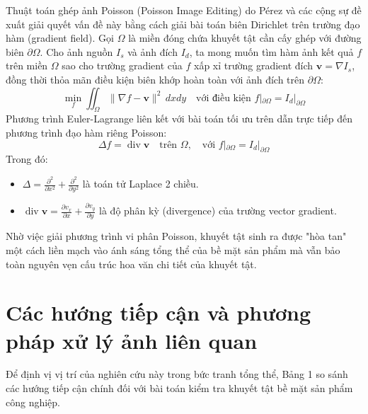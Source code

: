 Thuật toán ghép ảnh Poisson (Poisson Image Editing) do Pérez và các cộng sự đề xuất \cite{perez2003} giải quyết vấn đề này bằng cách giải bài toán biên Dirichlet trên trường đạo hàm (gradient field). Gọi $\Omega$ là miền đóng chứa khuyết tật cần cấy ghép với đường biên $\partial \Omega$. Cho ảnh nguồn $I_s$ và ảnh đích $I_d$, ta mong muốn tìm hàm ảnh kết quả $f$ trên miền $\Omega$ sao cho trường gradient của $f$ xấp xỉ trường gradient đích $\mathbf{v} = \nabla I_s$, đồng thời thỏa mãn điều kiện biên khớp hoàn toàn với ảnh đích trên $\partial \Omega$:
\begin{equation}
    \min_{f} \iint_{\Omega} \|\nabla f - \mathbf{v}\|^2 \, dx dy \quad \text{với điều kiện } f|_{\partial \Omega} = I_d|_{\partial \Omega}
\end{equation}
Phương trình Euler-Lagrange liên kết với bài toán tối ưu trên dẫn trực tiếp đến phương trình đạo hàm riêng Poisson:
\begin{equation}
    \Delta f = \operatorname{div} \mathbf{v} \quad \text{trên } \Omega, \quad \text{với } f|_{\partial \Omega} = I_d|_{\partial \Omega}
\end{equation}
Trong đó:
\begin{itemize}
    \item $\Delta = \frac{\partial^2}{\partial x^2} + \frac{\partial^2}{\partial y^2}$ là toán tử Laplace 2 chiều.
    \item $\operatorname{div} \mathbf{v} = \frac{\partial v_x}{\partial x} + \frac{\partial v_y}{\partial y}$ là độ phân kỳ (divergence) của trường vector gradient.
\end{itemize}
Nhờ việc giải phương trình vi phân Poisson, khuyết tật sinh ra được "hòa tan" một cách liền mạch vào ánh sáng tổng thể của bề mặt sản phẩm mà vẫn bảo toàn nguyên vẹn cấu trúc hoa văn chi tiết của khuyết tật.

\section{Các hướng tiếp cận và phương pháp xử lý ảnh liên quan}

Để định vị vị trí của nghiên cứu này trong bức tranh tổng thể, Bảng 1 so sánh các hướng tiếp cận chính đối với bài toán kiểm tra khuyết tật bề mặt sản phẩm công nghiệp.

